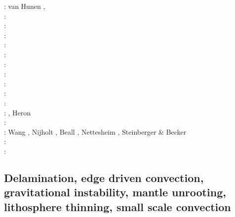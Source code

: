 \begin{scriptsize}
\twothousandfive: van Hunen \etal \cite{vazs05}, \cite{hagu05}\cite{wiwg05}\cite{mcjp05}\\
\twothousandsix: \cite{bube06}\cite{basv06}\cite{kasc06}\cite{fuwb06}\cite{colm06}\cite{pabs06}\cite{crnp06} \cite{sahm06}\\
\twothousandseven: \cite{afrf07}\cite{kore07}\cite{gewm07}\cite{jabn07}\\
\twothousandeight: \cite{affr08}\cite{tibb08}\cite{hapo08}\cite{busc08}\cite{clbz08}\cite{chlg08}
      \cite{kasb08}\cite{fabs08}\cite{chgu08}\cite{buit08}\cite{onlg08}\\
\twothousandnine: \cite{bupb09}\cite{plmg09}\cite{rigo09}\cite{bubg09}\cite{coco09}\\
\twothousandten: \cite{hamo10}\cite{fasm10}\cite{grpy10}\cite{vago10}\cite{plmf10}\cite{spgs10a}\cite{pygp10}
      \cite{jabw10}\\
\twothousandeleven: \cite{rera11}\cite{chss11}\\
\twothousandtwelve: \cite{wagw12}\cite{vacl12}\cite{buit12}\cite{kogp12}\cite{gohg12}\cite{trub12}\\
\twothousandthirteen: \cite{wazh13}\cite{krcu13}\cite{frbm13}\cite{wagw13}\cite{duyp13}\cite{rugb13} \cite{scdg13}\\
\twothousandfourteen: \cite{kava14}\cite{dusp14}\cite{wavp14}\cite{whbb14}\cite{scml14}
      \cite{mals14}\cite{gupm14}\cite{gahs14}\cite{mutg14}\\
\twothousandfifteen: \cite{wavp15}\cite{thkp15}\cite{mags15}\cite{duys15}\cite{dusp15}\\
\twothousandsixteen: \cite{wahz16}, Heron \etal \cite{heps16}\\
\twothousandseventeen: \cite{rugb17}\cite{ozgw17}\cite{vomc17}\cite{taac17}\cite{ithc17}\\
\twothousandeighteen: Wang \etal \cite{wavp18}, Nijholt \etal \cite{nigw18}, 
                      Beall \etal \cite{bemc18}, Nettesheim \etal \cite{neew18}, 
                      Steinberger \& Becker \cite{stbe18}\\
\twothousandnineteen: \cite{koen19}\cite{kipd19}\cite{crcm19}\cite{pedm19}\cite{mazz19}\cite{chch19}\\
\twothousandtwenty: \cite{yamq20}
\end{scriptsize}


\subsection{Delamination, edge driven convection, gravitational instability, mantle unrooting, lithosphere thinning, small scale convection} 

